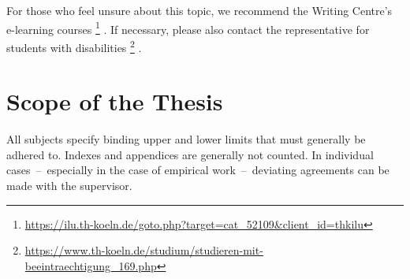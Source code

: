 For those who feel unsure about this topic, we recommend the Writing Centre's 
e-learning courses%
\footnote{\href{https://ilu.th-koeln.de/goto.php?target=cat\_52109\&client\_id=thkilu}{https://ilu.th-koeln.de/goto.php?target=cat\_52109\&client\_id=thkilu}}%
. If necessary, please also contact the representative for students with 
disabilities%
\footnote{\href{https://www.th-koeln.de/studium/studieren-mit-beeintraechtigung\_169.php}{https://www.th-koeln.de/studium/studieren-mit-beeintraechtigung\_169.php}}
.

\section{Scope of the Thesis}
All subjects specify binding upper and lower limits that must generally be 
adhered to. Indexes and appendices are generally not counted. In individual 
cases~--~especially in the case of empirical work~--~deviating agreements can 
be made with the supervisor.
